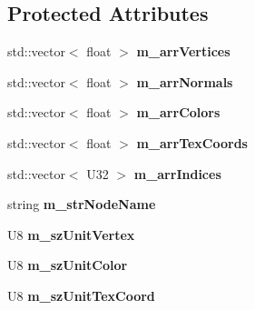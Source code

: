 \subsection*{Protected Attributes}
\begin{DoxyCompactItemize}
\item 
\hypertarget{classps_1_1scene_1_1MeshNode_a1b2d946bc514452b39c2abee19ce3416}{}std\+::vector$<$ float $>$ {\bfseries m\+\_\+arr\+Vertices}\label{classps_1_1scene_1_1MeshNode_a1b2d946bc514452b39c2abee19ce3416}

\item 
\hypertarget{classps_1_1scene_1_1MeshNode_ae3f478aaf92026791d7f017994c799d8}{}std\+::vector$<$ float $>$ {\bfseries m\+\_\+arr\+Normals}\label{classps_1_1scene_1_1MeshNode_ae3f478aaf92026791d7f017994c799d8}

\item 
\hypertarget{classps_1_1scene_1_1MeshNode_af99ba6439e4d8a6797a03c17780206ed}{}std\+::vector$<$ float $>$ {\bfseries m\+\_\+arr\+Colors}\label{classps_1_1scene_1_1MeshNode_af99ba6439e4d8a6797a03c17780206ed}

\item 
\hypertarget{classps_1_1scene_1_1MeshNode_a985972268af3b8a730a2b9f7ee6b1e35}{}std\+::vector$<$ float $>$ {\bfseries m\+\_\+arr\+Tex\+Coords}\label{classps_1_1scene_1_1MeshNode_a985972268af3b8a730a2b9f7ee6b1e35}

\item 
\hypertarget{classps_1_1scene_1_1MeshNode_ac4a941f49efe920d1495a40bd13e62dc}{}std\+::vector$<$ U32 $>$ {\bfseries m\+\_\+arr\+Indices}\label{classps_1_1scene_1_1MeshNode_ac4a941f49efe920d1495a40bd13e62dc}

\item 
\hypertarget{classps_1_1scene_1_1MeshNode_a596b0d0253ccde3015bd749097b3cf27}{}string {\bfseries m\+\_\+str\+Node\+Name}\label{classps_1_1scene_1_1MeshNode_a596b0d0253ccde3015bd749097b3cf27}

\item 
\hypertarget{classps_1_1scene_1_1MeshNode_ac798f6e24021251b8290e14416b424ff}{}U8 {\bfseries m\+\_\+sz\+Unit\+Vertex}\label{classps_1_1scene_1_1MeshNode_ac798f6e24021251b8290e14416b424ff}

\item 
\hypertarget{classps_1_1scene_1_1MeshNode_a138d8ab801fc1007a872961edfa16a60}{}U8 {\bfseries m\+\_\+sz\+Unit\+Color}\label{classps_1_1scene_1_1MeshNode_a138d8ab801fc1007a872961edfa16a60}

\item 
\hypertarget{classps_1_1scene_1_1MeshNode_a43eccfcb1b1781229827a2946be4691a}{}U8 {\bfseries m\+\_\+sz\+Unit\+Tex\+Coord}\label{classps_1_1scene_1_1MeshNode_a43eccfcb1b1781229827a2946be4691a}


\end{DoxyCompactItemize}
